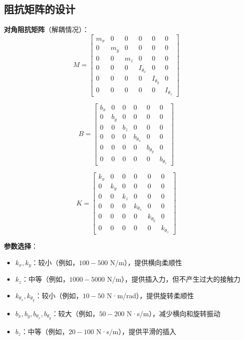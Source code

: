 \documentclass[12pt,a4paper]{article}
\begin{document}
\subsection{阻抗矩阵的设计}

\textbf{对角阻抗矩阵}（解耦情况）：
\begin{equation}
M = \begin{bmatrix}
m_x & 0 & 0 & 0 & 0 & 0 \\
0 & m_y & 0 & 0 & 0 & 0 \\
0 & 0 & m_z & 0 & 0 & 0 \\
0 & 0 & 0 & I_{\theta_x} & 0 & 0 \\
0 & 0 & 0 & 0 & I_{\theta_y} & 0 \\
0 & 0 & 0 & 0 & 0 & I_{\theta_z}
\end{bmatrix}
\end{equation}

\begin{equation}
B = \begin{bmatrix}
b_x & 0 & 0 & 0 & 0 & 0 \\
0 & b_y & 0 & 0 & 0 & 0 \\
0 & 0 & b_z & 0 & 0 & 0 \\
0 & 0 & 0 & b_{\theta_x} & 0 & 0 \\
0 & 0 & 0 & 0 & b_{\theta_y} & 0 \\
0 & 0 & 0 & 0 & 0 & b_{\theta_z}
\end{bmatrix}
\end{equation}

\begin{equation}
K = \begin{bmatrix}
k_x & 0 & 0 & 0 & 0 & 0 \\
0 & k_y & 0 & 0 & 0 & 0 \\
0 & 0 & k_z & 0 & 0 & 0 \\
0 & 0 & 0 & k_{\theta_x} & 0 & 0 \\
0 & 0 & 0 & 0 & k_{\theta_y} & 0 \\
0 & 0 & 0 & 0 & 0 & k_{\theta_z}
\end{bmatrix}
\end{equation}

\textbf{参数选择}：
\begin{itemize}
\item $k_x, k_y$：较小（例如，$100-500$ N/m），提供横向柔顺性
\item $k_z$：中等（例如，$1000-5000$ N/m），提供插入力，但不产生过大的接触力
\item $k_{\theta_x}, k_{\theta_y}$：较小（例如，$10-50$ N·m/rad），提供旋转柔顺性
\item $b_x, b_y, b_{\theta_x}, b_{\theta_y}$：较大（例如，$50-200$ N·s/m），减少横向和旋转振动
\item $b_z$：中等（例如，$20-100$ N·s/m），提供平滑的插入
\end{itemize}
\end{document}
